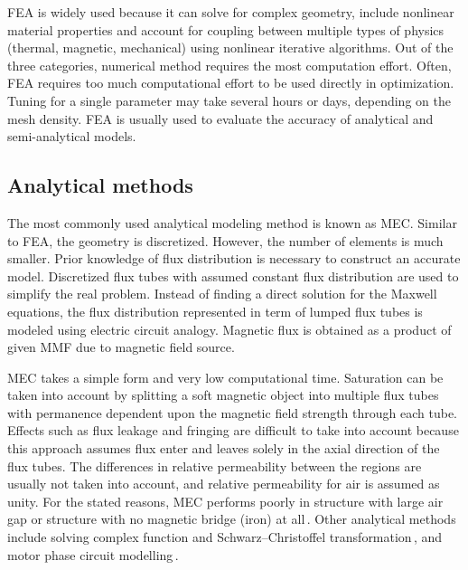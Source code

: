         \acs{FEA} is widely used because it can solve for complex geometry, include nonlinear material properties and account for coupling between multiple types of physics (thermal, magnetic, mechanical) using nonlinear iterative algorithms. Out of the three categories, numerical method requires the most computation effort. Often, \acs{FEA} requires too much computational effort to be used directly in optimization. Tuning for a single parameter may take several hours or days, depending on the mesh density. \acs{FEA} is usually used to evaluate the accuracy of analytical and semi-analytical models.

    
    \subsection{Analytical methods}                 \label{Chapter:background/modelling techniques for designing motors/analytical methods}
    
    
        The most commonly used analytical modeling method is known as \ac{MEC}. Similar to \acs{FEA}, the geometry is discretized. However, the number of elements is much smaller. Prior knowledge of flux distribution is necessary to construct an accurate model. Discretized flux tubes with assumed constant flux distribution are used to simplify the real problem. Instead of finding a direct solution for the Maxwell equations, the flux distribution represented in term of lumped flux tubes is modeled using electric circuit analogy. Magnetic flux is obtained as a product of given \ac{MMF} due to magnetic field source.  
        
        \acs{MEC} takes a simple form and very low computational time. Saturation can be taken into account by splitting a soft magnetic object into multiple flux tubes with permanence dependent upon the magnetic field strength through each tube. Effects such as flux leakage and fringing are difficult to take into account because this approach assumes flux enter and leaves solely in the axial direction of the flux tubes. The differences in relative permeability between the regions are usually not taken into account, and relative permeability for air is assumed as unity. For the stated reasons, \acs{MEC} performs poorly in structure with large air gap or structure with no magnetic bridge (iron) at all\,\cite{DeBoeij2006ModelingStructures}. Other analytical methods include solving complex function and Schwarz–Christoffel transformation\,\cite{Zarko2006AnalyticalPermeance}, and motor phase circuit modelling\,\cite{Proca2003AnalyticalMagnets}.
        
